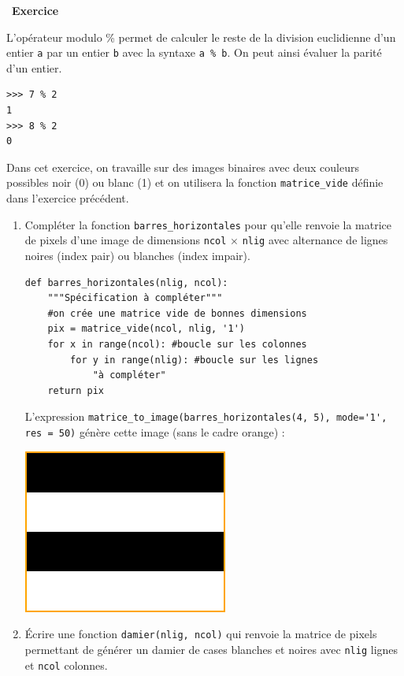 \documentclass[a4paper, french, 12pt]{article}
\newcounter{exo}
\newenvironment{exercice}[1]
{\par \medskip   \addtocounter{exo}{1} \noindent  
\begin{bclogo}[arrondi =0.1,   noborder = true, logo=\bccrayon, marge=4]{~\textbf{Exercice} \textbf{\theexo} {\itshape #1} }  \par}
{
\end{bclogo}
 \par \bigskip }
\newcounter{def}
\begin{document}
\begin{exercice}{}

L'opérateur  modulo \% permet de calculer le reste de la division euclidienne d'un entier \texttt{a} par un entier \texttt{b} avec la syntaxe \texttt{a \% b}. On peut ainsi évaluer la parité d'un entier.

\begin{lstlisting}[style=compil]
>>> 7 % 2
1
>>> 8 % 2
0
\end{lstlisting}


Dans cet exercice, on travaille sur des images binaires avec deux couleurs possibles noir (0) ou blanc (1) et on utilisera la fonction \texttt{matrice\_vide} définie dans l'exercice précédent.

\begin{enumerate}
	\item Compléter la fonction \texttt{barres\_horizontales} pour qu'elle renvoie la matrice de pixels d'une image  de dimensions  \texttt{ncol} $\times$ \texttt{nlig}  avec alternance   de lignes noires (index pair)  ou blanches (index impair).

\begin{lstlisting}[style=rond]
def barres_horizontales(nlig, ncol):
	"""Spécification à compléter"""
    #on crée une matrice vide de bonnes dimensions
    pix = matrice_vide(ncol, nlig, '1')
    for x in range(ncol): #boucle sur les colonnes
        for y in range(nlig): #boucle sur les lignes
            "à compléter"
    return pix 
\end{lstlisting}

L'expression \lstinline+matrice_to_image(barres_horizontales(4, 5), mode='1', res = 50)+ génère cette image (sans le cadre orange) :
\begin{center}
\includegraphics[scale=0.5]{images/bandes-horizontales-cadre.png}
\end{center}
\item Écrire une fonction \texttt{damier(nlig, ncol)} qui renvoie la matrice de pixels permettant de générer un damier de cases blanches et noires avec \texttt{nlig} lignes et \texttt{ncol} colonnes.


\end{enumerate}
\end{exercice}
\end{document}
